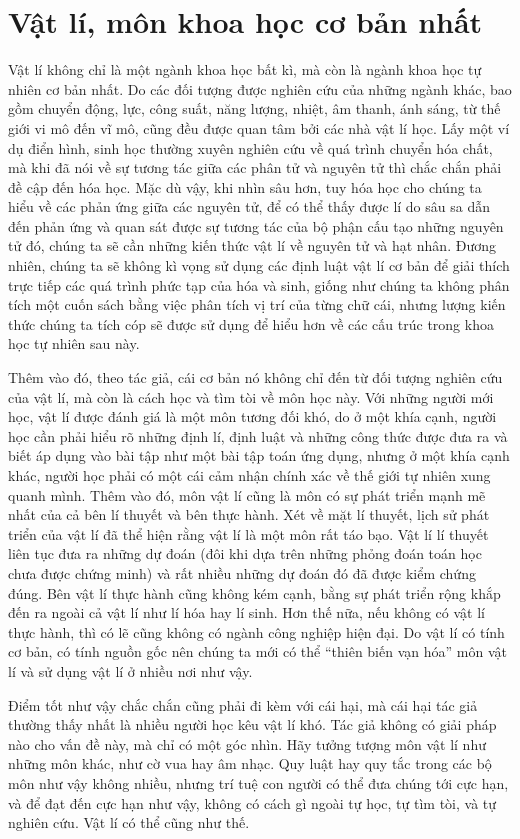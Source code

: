 \section{Vật lí, môn khoa học cơ bản nhất}

Vật lí không chỉ là một ngành khoa học bất kì, mà còn là ngành khoa học tự nhiên cơ bản nhất. Do các đối tượng được nghiên cứu của những ngành khác, bao gồm chuyển động, lực, công suất, năng lượng, nhiệt, âm thanh, ánh sáng, từ thế giới vi mô đến vĩ mô, cũng đều được quan tâm bởi các nhà vật lí học. Lấy một ví dụ điển hình, sinh học thường xuyên nghiên cứu về quá trình chuyển hóa chất, mà khi đã nói về sự tương tác giữa các phân tử và nguyên tử thì chắc chắn phải đề cập đến hóa học. Mặc dù vậy, khi nhìn sâu hơn, tuy hóa học cho chúng ta hiểu về các phản ứng giữa các nguyên tử, để có thể thấy được lí do sâu sa dẫn đến phản ứng và quan sát được sự tương tác của bộ phận cấu tạo những nguyên tử đó, chúng ta sẽ cần những kiến thức vật lí về nguyên tử và hạt nhân. Đương nhiên, chúng ta sẽ không kì vọng sử dụng các định luật vật lí cơ bản để giải thích trực tiếp các quá trình phức tạp của hóa và sinh, giống như chúng ta không phân tích một cuốn sách bằng việc phân tích vị trí của từng chữ cái, nhưng lượng kiến thức chúng ta tích cóp sẽ được sử dụng để hiểu hơn về các cấu trúc trong khoa học tự nhiên sau này.

Thêm vào đó, theo tác giả, cái cơ bản nó không chỉ đến từ đối tượng nghiên cứu của vật lí, mà còn là cách học và tìm tòi về môn học này. Với những người mới học, vật lí được đánh giá là một môn tương đối khó, do ở một khía cạnh, người học cần phải hiểu rõ những định lí, định luật và những công thức được đưa ra và biết áp dụng vào bài tập như một bài tập toán ứng dụng, nhưng ở một khía cạnh khác, người học phải có một cái cảm nhận chính xác về thế giới tự nhiên xung quanh mình. Thêm vào đó, môn vật lí cũng là môn có sự phát triển mạnh mẽ nhất của cả bên lí thuyết và bên thực hành. Xét về mặt lí thuyết, lịch sử phát triển của vật lí đã thể hiện rằng vật lí là một môn rất táo bạo. Vật lí lí thuyết liên tục đưa ra những dự đoán (đôi khi dựa trên những phỏng đoán toán học chưa được chứng minh) và rất nhiều những dự đoán đó đã được kiểm chứng đúng. Bên vật lí thực hành cũng không kém cạnh, bằng sự phát triển rộng khắp đến ra ngoài cả vật lí như lí hóa hay lí sinh. Hơn thế nữa, nếu không có vật lí thực hành, thì có lẽ cũng không có ngành công nghiệp hiện đại. Do vật lí có tính cơ bản, có tính nguồn gốc nên chúng ta mới có thể ``thiên biến vạn hóa'' môn vật lí và sử dụng vật lí ở nhiều nơi như vậy.

Điểm tốt như vậy chắc chắn cũng phải đi kèm với cái hại, mà cái hại tác giả thường thấy nhất là nhiều người học kêu vật lí khó. Tác giả không có giải pháp nào cho vấn đề này, mà chỉ có một góc nhìn. Hãy tưởng tượng môn vật lí như những môn khác, như cờ vua hay âm nhạc. Quy luật hay quy tắc trong các bộ môn như vậy không nhiều, nhưng trí tuệ con người có thể đưa chúng tới cực hạn, và để đạt đến cực hạn như vậy, không có cách gì ngoài tự học, tự tìm tòi, và tự nghiên cứu. Vật lí có thể cũng như thế. 